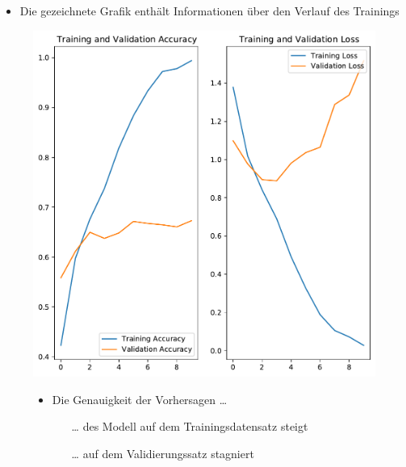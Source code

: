 \documentclass[t]{beamer}
\begin{document}
\begin{frame}
    \begin{itemize}
        \item Die gezeichnete Grafik enthält Informationen über den Verlauf des Trainings
    \end{itemize}
    \begin{figure}
        \begin{minipage}{0.5\textwidth}
            \includegraphics[width=\textwidth]{./teach-plots/pre_augmentation.pdf}
        \end{minipage}\hfill
        \begin{minipage}{0.5\textwidth}
            \begin{itemize}
                \item Die Genauigkeit der Vorhersagen \ldots
                \begin{itemize}
                    \item[\ldots] des Modell auf dem Trainingsdatensatz steigt
                    \item[\ldots] auf dem Validierungssatz stagniert
                \end{itemize}
            \end{itemize}
        \end{minipage}
    \end{figure}
\end{frame}
\end{document}
